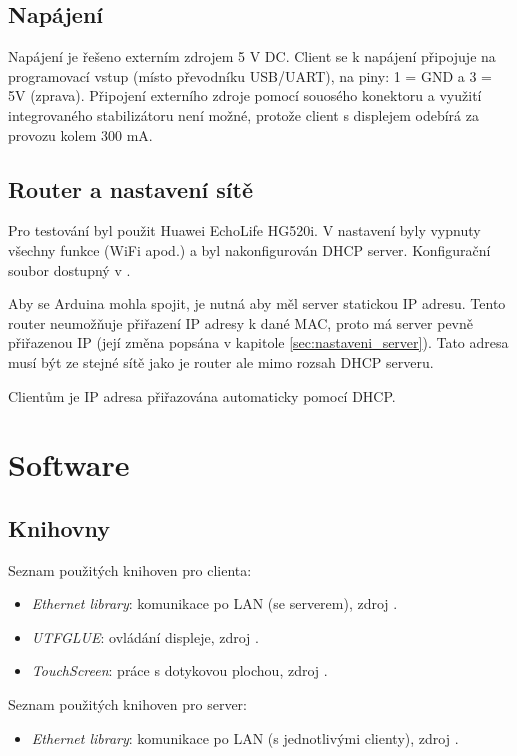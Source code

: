 \documentclass[a4paper,12pt, twoside]{article} %
\begin{document}
\subsection{Napájení}
\label{sec:napajeni}
Napájení je řešeno externím zdrojem 5 V DC. Client se k napájení připojuje na programovací vstup (místo převodníku USB/UART), na piny: 1 = GND a 3 = 5V (zprava). Připojení externího zdroje pomocí souosého konektoru a využití integrovaného stabilizátoru není možné, protože client s displejem odebírá za provozu kolem 300 mA. 
\subsection{Router a nastavení sítě}
\label{sec:router}
Pro testování byl použit Huawei EchoLife HG520i. V nastavení byly vypnuty všechny funkce (WiFi apod.) a byl nakonfigurován DHCP server. Konfigurační soubor dostupný v \cite{router_config}.

Aby se Arduina mohla spojit, je nutná aby měl server statickou IP adresu. Tento router neumožňuje přiřazení IP adresy k dané MAC, proto má server pevně přiřazenou IP (její změna popsána v kapitole \ref{sec:nastaveni_server}). Tato adresa musí být ze stejné sítě jako je router ale mimo rozsah DHCP serveru.

Clientům je IP adresa přiřazována automaticky pomocí DHCP.
\section{Software}
\subsection{Knihovny}
\label{sec:knihovny}
Seznam použitých knihoven pro clienta:
\begin{itemize}
\item \textit{Ethernet library}: komunikace po LAN (se serverem), zdroj \cite{library_ethernet}.
\item \textit{UTFGLUE}: ovládání displeje, zdroj \cite{library_UTFGLUE}.
\item \textit{TouchScreen}: práce s dotykovou plochou, zdroj  \cite{library_touch}.
\end{itemize}

Seznam použitých knihoven pro server:
\begin{itemize}
\item \textit{Ethernet library}: komunikace po LAN (s jednotlivými clienty), zdroj \cite{library_ethernet}.
\end{itemize}
\end{document}
